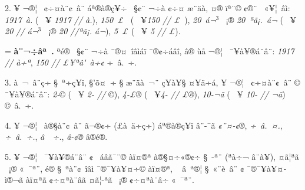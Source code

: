 \documentclass[12pt,a4paper]{article}
\begin{document}
\bigskip

2. ^^8d^^a5 ^^ac^^ae^^a6^^ad^^a0 ^^a2^^f7^^a4^^e0^^a8^^a2^^a0^^e2^^a8 ^^e1^^aa^^ae^^e0^^ae^^e7^^a5^^ad^^f7 ^^ad^^a0^^a7^^a2^^a8 ^^ac^^f7^^e0 ^^a2^^f7^^a4 ^^e6^^a8^^e4^^e0, ^^a4^^ae ^^ef^^aa^^a8^^a9
^^a2^^ae^^ad^^a8 ^^ad^^a0^^ab^^a5^^a6^^a0^^e2^^ec: \emph{1917~^^e0.} (^^a0 ^^ad^^a5 \emph{1917 // ^^e0.}), \emph{150~^^a3^^a0}
(^^a0 ^^ad^^a5\linebreak \emph{150 // ^^a3^^a0}), \emph{20~^^e1^^ac$^3$} ^^a0^^a1^^ae \emph{20~^^aa^^e3^^a1.~^^e1^^ac}
(^^a0 ^^ad^^a5 \emph{20 // ^^e1^^ac$^3$} ^^a0^^a1^^ae \emph{20 //\linebreak ^^aa^^e3^^a1. ^^e1^^ac}), \emph{5~^^a3}
(^^a0 ^^ad^^a5 \emph{5 // ^^a3}).

\bigskip

{\footnotesize

\hangindent=\parindent \hspace*{\parindent}
\textbf{^^8f^^e0^^a8^^ac^^f7^^e2^^aa^^a0.} ^^9f^^aa^^e9^^ae ^^ad^^a0^^a7^^a2^^a8 ^^ac^^f7^^e0 ^^af^^ae^^a4^^a0^^ee^^e2^^ec^^e1^^ef ^^af^^ae^^a2^^ad^^f7^^e1^^e2^^ee,
^^e2^^ae ^^f9^^e5 ^^ac^^ae^^a6^^ad^^a0 ^^af^^a5\-^^e0^^a5^^ad^^ae^^e1^^a8^^e2^^a8: \emph{1917 // ^^e0^^f7^^aa}, \emph{150 // ^^a3^^a5^^aa^^e2\'^^a0^^e0^^f7^^a2} ^^f7~^^e2.~^^f7^^ad.

}

\bigskip

3. ^^83^^e0^^a0^^ac^^a0^^e2^^a8^^e7^^ad^^f7 ^^a7^^a0^^aa^^f7^^ad^^e7^^a5^^ad^^ad^^ef, ^^a7'^^f5^^a4^^ad^^a0^^ad^^f7 ^^a7 ^^e6^^a8^^e4^^e0^^a0^^ac^^a8 ^^e7^^a5^^e0^^a5^^a7 ^^a4^^a5^^e4^^f7^^e1, ^^ad^^a5\linebreak
^^ac^^ae^^a6^^ad^^a0 ^^a2^^f7^^a4^^e0^^a8^^a2^^a0^^e2^^a8 ^^a9 ^^af^^a5^^e0^^a5^^ad^^ae^^e1^^a8^^e2^^a8: \mbox{\emph{2-^^a9}} (^^a0 ^^ad^^a5 \emph{2- // ^^a9}),
\mbox{\emph{4-^^a3^^ae}} (^^a0 ^^ad^^a5\linebreak \emph{4- // ^^a3^^ae}), \mbox{\emph{10-^^ac^^e3}}
(^^a0 ^^ad^^a5 \emph{10- // ^^ac^^e3}) ^^a9~^^e2.~^^f7^^ad.

4. ^^8d^^a5 ^^ac^^ae^^a6^^ad^^a0 ^^e0^^ae^^a7^^e0^^a8^^a2^^a0^^e2^^a8 ^^e3^^ac^^ae^^a2^^ad^^f7 (^^a3^^e0^^a0^^e4^^f7^^e7^^ad^^f7) ^^e1^^aa^^ae^^e0^^ae^^e7^^a5^^ad^^ad^^ef ^^e2^^a8-\linebreak{}^^af^^e3 \mbox{\emph{^^a2^^a8^^a4-^^a2^^ae}},
\mbox{\emph{^^f7~^^e2.~^^a4.}}, \mbox{\emph{^^f7~^^e2.~^^f7^^ad.}}, \mbox{\emph{^^e2^^a0~^^f7^^ad.}},
\mbox{\emph{^^e2-^^a2^^ae}} ^^e2^^ae^^e9^^ae.

5. ^^8d^^a5 ^^ac^^ae^^a6^^ad^^a0 ^^af^^a5^^e0^^a5^^ad^^ae^^e1^^a8^^e2^^a8 ^^a2 ^^ad^^a0^^e1^^e2^^e3^^af^^ad^^a8^^a9 ^^e0^^ef^^a4^^ae^^aa ^^e0^^ae^^a7^^a4^^f7^^ab^^ae^^a2^^f7 ^^a7^^ad^^a0-\linebreak{}^^aa^^a8 (^^aa^^e0^^f7^^ac
^^e2^^a8^^e0^^a5), ^^a4^^e3^^a6^^aa^^e3 ^^a0^^a1^^ae ^^ab^^a0^^af^^aa^^a8, ^^e9^^ae ^^a7^^a0^^aa^^e0^^a8^^a2^^a0^^ee^^e2^^ec ^^af^^ae^^af^^a5^^e0^^a5^^a4^^ad^^f7^^a9 ^^e0^^ef^^a4^^ae^^aa, ^^a0 ^^e2^^a0^^aa^^ae^^a6
^^a7^^a0^^ab^^a8^^e8^^a0^^e2^^a8 ^^a2 ^^af^^ae^^af^^a5^^e0^^a5^^a4^^ad^^ec^^ae^^ac^^e3 ^^e0^^ef^^a4^^aa^^e3 ^^a2^^f7^^a4^^aa^^e0^^a8^^e2^^e3 ^^a4^^e3^^a6-\linebreak{}^^aa^^e3 ^^a0^^a1^^ae ^^a2^^f7^^a4^^aa^^e0^^a8^^e2^^f7 ^^ab^^a0^^af^^aa^^a8.
\end{document}
